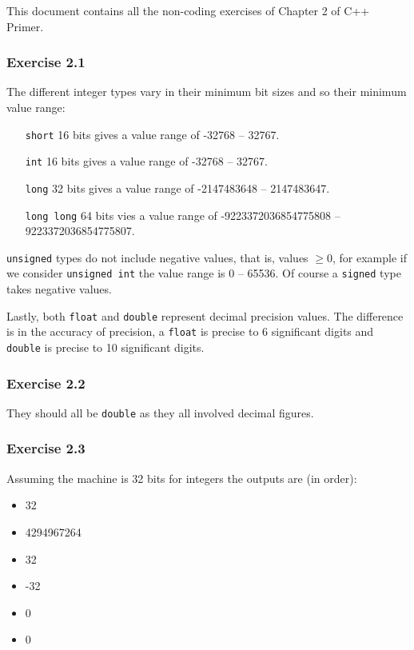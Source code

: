 \documentclass[12pt, a4paper]{article}
\begin{document}
This document contains all the non-coding exercises of Chapter 2 of C++ Primer.
\subsubsection*{Exercise 2.1}

The different integer types vary in their minimum bit sizes and so their minimum value range:
\begin{itemize}
	\item [\texttt{short}]
		16 bits gives a value range of -32768 -- 32767.
	\item [\texttt{int}]
		16 bits gives a value range of -32768 -- 32767.
	\item [\texttt{long}]
		32 bits gives a value range of -2147483648 -- 2147483647.
	\item [\texttt{long long}]
		64 bits vies a value range of -9223372036854775808 -- 9223372036854775807.
\end{itemize}

\texttt{unsigned} types do not include negative values, that is, values $\geq 0$, for example if we consider \texttt{unsigned int} the value range is 0 -- 65536. Of course a \texttt{signed} type takes negative values.

Lastly, both \texttt{float} and \texttt{double} represent decimal precision values. The difference is in the accuracy of precision, a \texttt{float} is precise to 6 significant digits and \texttt{double} is precise to 10 significant digits.

\subsubsection*{Exercise 2.2}
They should all be \texttt{double} as they all involved decimal figures.

\subsubsection*{Exercise 2.3}
Assuming the machine is 32 bits for integers the outputs are (in order):
\begin{itemize}
	\item 32
	\item 4294967264
	\item 32
	\item -32
	\item 0
	\item 0
\end{itemize}
\end{document}

